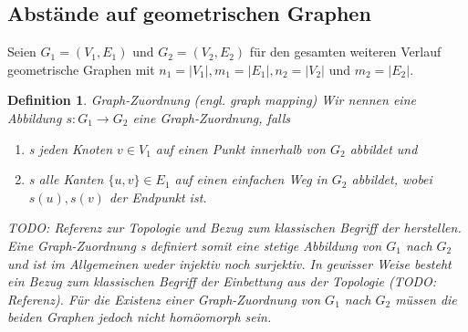 \documentclass[a4paper, 12pt, twoside]{article}
\theoremstyle{Format1} %
\newtheorem{Def}{Definition}[section]       %
\begin{document}
\subsection{Abstände auf geometrischen Graphen}

Seien $ G_1=(V_1, E_1) $ und $ G_2=(V_2, E_2) $ für den gesamten weiteren Verlauf geometrische Graphen mit
$n_1 = |V_1|, m_1 = |E_1|, n_2 = |V_2|$ und $m_2 = |E_2|$.

\begin{Def}
	Graph-Zuordnung (engl. graph mapping)
	Wir nennen eine Abbildung $s: G_1 \to G_2 $ eine \textit{Graph-Zuordnung}, falls
    	\begin{enumerate}
		\item[1)] s jeden Knoten $ v \in V_1 $ auf einen Punkt innerhalb von $ G_2 $ abbildet und
		\item[2)] s alle Kanten $ \{u,v\} \in E_1 $ auf einen einfachen Weg in $G_2$ abbildet, wobei $s(u), s(v)$ der Endpunkt ist.
    	\end{enumerate}

	TODO: Referenz zur Topologie und Bezug zum klassischen Begriff der  herstellen.
	Eine Graph-Zuordnung s definiert somit eine stetige Abbildung von $ G_1 $ nach $ G_2 $ und ist im Allgemeinen weder injektiv noch surjektiv.
	In gewisser Weise besteht ein Bezug zum klassischen Begriff der \textit{Einbettung} aus der Topologie (TODO: Referenz).
	Für die Existenz einer Graph-Zuordnung von $ G_1 $ nach $ G_2 $ müssen die beiden Graphen jedoch nicht homöomorph sein.

\end{Def}
\end{document}
